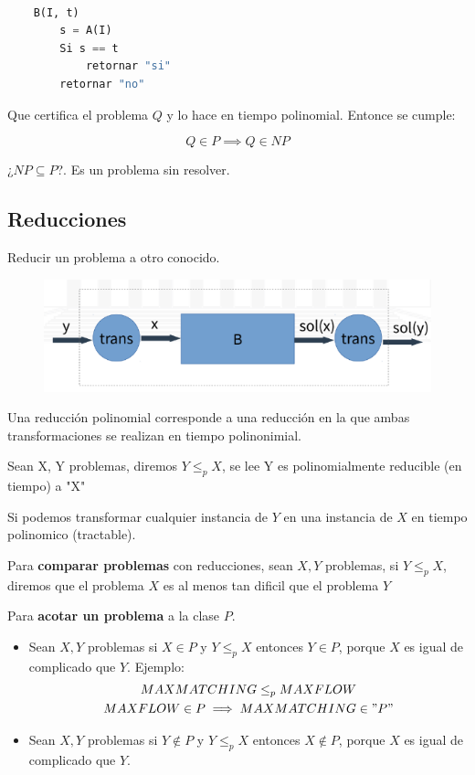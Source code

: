\documentclass{article}
\begin{document}
\begin{lstlisting}[language=Python, caption=Algoritmo B]

    B(I, t)
        s = A(I)
        Si s == t
            retornar "si"
        retornar "no"

\end{lstlisting}

Que certifica el problema \(Q\) y lo hace en tiempo polinomial. Entonce se cumple:

\[
    Q \in P \implies Q \in NP
\]

¿\(NP \subseteq P\)?. Es un problema sin resolver.


\subsection{Reducciones}

Reducir un problema a otro conocido.

\begin{figure}[h!]
    \includegraphics[width=\linewidth]{imagenes/reduccion.png}
\end{figure}

Una reducción polinomial corresponde a una reducción en la que ambas transformaciones se realizan en tiempo polinonimial.

Sean X, Y problemas, diremos \(Y \leq_p X\), se lee Y es polinomialmente reducible (en tiempo) a "X"

Si podemos transformar cualquier instancia de \(Y\) en una instancia de \(X\) en tiempo polinomico (tractable).

Para \textbf{comparar problemas} con reducciones, sean \(X, Y\) problemas, si \(Y \leq_p X\), diremos que 
el problema \(X\) es al menos tan dificil que el problema \(Y\)

Para \textbf{acotar un problema} a la clase \(P\). 
\begin{itemize}
    \item Sean \(X,Y\) problemas si \(X \in P\) y \(Y \leq_p X\) 
    entonces \(Y \in P\), porque \(X\) es igual de complicado que \(Y\). Ejemplo:
    \begin{gather*}
        MAXMATCHING \leq_p MAXFLOW \\
        MAXFLOW \in P \implies MAXMATCHING \in "P"    
    \end{gather*}
    
    \item Sean \(X,Y\) problemas si \(Y \notin P\) y \(Y \leq_p X\) 
    entonces \(X \notin P\), porque \(X\) es igual de complicado que \(Y\).
    
\end{itemize}
\end{document}
